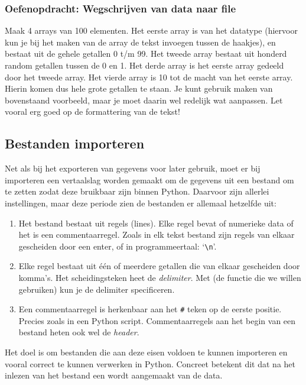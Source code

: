 \documentclass[a4paper,11pt, fleqn]{article}
\begin{document}
\subsubsection*{Oefenopdracht: Wegschrijven van data naar file}
Maak 4 arrays van 100 elementen. Het eerste array is van het datatype  (hiervoor kun je bij het maken van de array de tekst  invoegen tussen de haakjes), en bestaat uit de gehele getallen 0 t/m 99. Het tweede array bestaat uit honderd random getallen tussen de 0 en 1. Het derde array is het eerste array gedeeld door het tweede array. Het vierde array is 10 tot de macht van het eerste array. Hierin komen dus hele grote getallen te staan. Je kunt gebruik maken van bovenstaand voorbeeld, maar je moet daarin wel redelijk wat aanpassen. Let vooral erg goed op de formattering van de tekst!
\fi

\subsection{Bestanden importeren}
\label{Ch_Importeren}
Net als bij het exporteren van gegevens voor later gebruik, moet er bij importeren een vertaalslag worden gemaakt om de gegevens uit een bestand om te zetten zodat deze bruikbaar zijn binnen Python. Daarvoor zijn allerlei instellingen, maar deze periode zien de bestanden er allemaal hetzelfde uit:

\begin{enumerate}
\item Het bestand bestaat uit regels (lines). Elke regel bevat of numerieke data of het is een commentaarregel. Zoals in elk tekst bestand zijn regels van elkaar gescheiden door een enter, of in programmeertaal: `\verb,\n,'.
\item Elke regel bestaat uit \'e\'en of meerdere getallen die van elkaar gescheiden door komma's. Het scheidingsteken heet de \textit{delimiter}. Met  (de functie die we willen gebruiken) kun je de delimiter specificeren. 
\item Een commentaarregel is herkenbaar aan het \verb,#, teken op de eerste positie. Precies zoals in een Python script. Commentaarregels aan het begin van een bestand heten ook wel de {\it header}.
\end{enumerate}

Het doel is om bestanden die aan deze eisen voldoen te kunnen importeren en vooral correct te kunnen verwerken in Python. Concreet betekent dit dat na het inlezen van het bestand een  wordt aangemaakt van de data. 
\end{document}

